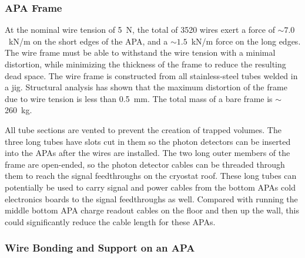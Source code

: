 \subsubsection{APA Frame}
\label{subsec:fd-ref-apaframes}

At the nominal wire tension of 5~N, the total of 3520 wires exert a
force of $\sim 7.0$~kN/m on the short edges of the APA, and a $\sim
1.5 $~kN/m force on the long edges. The wire frame must be able to
withstand the wire tension with a minimal distortion, while minimizing
the thickness of the frame to reduce the resulting dead space. The
wire frame is constructed from all stainless-steel tubes welded in a
jig.  Structural analysis has shown that the maximum distortion of the
frame due to wire tension is less than 0.5~mm. The total mass of a
bare frame is $\sim$260~kg.


All tube sections are vented to prevent the creation of trapped
volumes. The three long tubes have slots cut in them so the photon
detectors can be inserted into the APAs after the wires are installed.
The two long outer members of the frame are open-ended, so the photon
detector cables can be threaded through them to reach the signal
feedthroughs on the cryostat roof.  These long tubes can potentially
be used to carry signal and power cables from the bottom APAs cold
electronics boards to the signal feedthroughs as well.  Compared with
running the middle bottom APA charge readout cables on the floor and
then up the wall, this could significantly reduce the cable length for
these APAs.


\subsubsection{Wire Bonding and Support on an APA}
\label{subsec:fd-ref-wirewrap}


